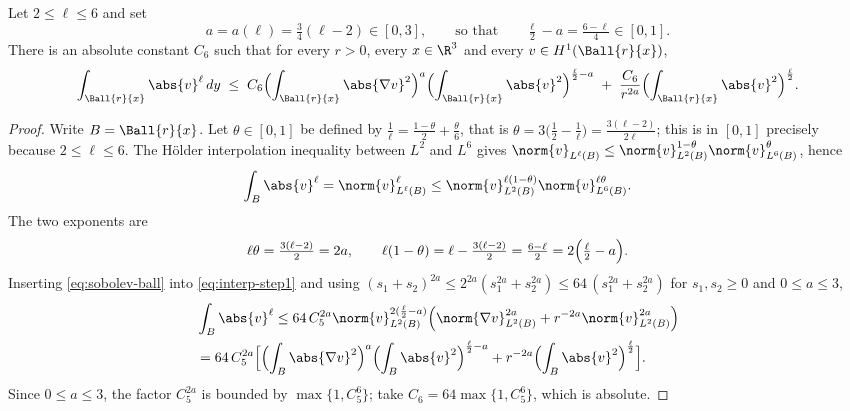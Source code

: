 \documentclass[11pt,reqno]{amsart}
\begin{document}
\begin{lemma}\label{lem:interpolation-ball}
Let $2\le \ell\le6$ and set
\begin{equation}\label{eq:a-exponent}
  a=a(\ell)=\tfrac34(\ell-2)\in[0,3],
  \qquad\text{so that}\qquad
  \tfrac \ell2-a=\tfrac{6-\ell}{4}\in[0,1].
\end{equation}
There is an absolute constant $C_{6}$ such that for every $r>0$, every
$x\in\R^{3}$ and every $v\in H^{1}(\Ball{r}{x})$,
\begin{equation}\label{eq:interpolation-ball}
  \int_{\Ball{r}{x}}\abs{v}^{\ell}\,dy
  \;\le\;C_{6}\Bigl(\int_{\Ball{r}{x}}\abs{\nabla v}^{2}\Bigr)^{a}
      \Bigl(\int_{\Ball{r}{x}}\abs{v}^{2}\Bigr)^{\frac \ell2-a}
     \;+\;\frac{C_{6}}{r^{2a}}\Bigl(\int_{\Ball{r}{x}}\abs{v}^{2}\Bigr)^{\frac \ell2}.
\end{equation}
\end{lemma}

\begin{proof}
Write $B=\Ball{r}{x}$. Let $\theta\in[0,1]$ be defined by
$\tfrac1\ell=\tfrac{1-\theta}{2}+\tfrac{\theta}{6}$, that is
$\theta=3\bigl(\tfrac12-\tfrac1\ell\bigr)=\tfrac{3(\ell-2)}{2\ell}$; this is in $[0,1]$
precisely because $2\le \ell\le6$. The H\"older interpolation inequality between
$L^{2}$ and $L^{6}$ gives
$\norm{v}_{L^{\ell}(B)}\le\norm{v}_{L^{2}(B)}^{1-\theta}\norm{v}_{L^{6}(B)}^{\theta}$,
hence
\begin{equation}\label{eq:interp-step1}
  \int_{B}\abs{v}^{\ell}
  =\norm{v}_{L^{\ell}(B)}^{\ell}
  \le\norm{v}_{L^{2}(B)}^{\ell(1-\theta)}\norm{v}_{L^{6}(B)}^{\ell\theta} .
\end{equation}
The two exponents are
\[
  \ell\theta=\tfrac{3(\ell-2)}{2}=2a,
  \qquad
  \ell(1-\theta)=\ell-\tfrac{3(\ell-2)}{2}=\tfrac{6-\ell}{2}=2\Bigl(\tfrac \ell2-a\Bigr).
\]
Inserting \eqref{eq:sobolev-ball} into \eqref{eq:interp-step1} and using
$(s_{1}+s_{2})^{2a}\le2^{2a}(s_{1}^{2a}+s_{2}^{2a})\le 64\,(s_{1}^{2a}+s_{2}^{2a})$
for $s_{1},s_{2}\ge0$ and $0\le a\le3$,
\[\begin{aligned}
  &\int_{B}\abs{v}^{\ell}
  \le 64\,C_{5}^{2a}\norm{v}_{L^{2}(B)}^{2(\frac \ell2-a)}
     \Bigl(\norm{\nabla v}_{L^{2}(B)}^{2a}+r^{-2a}\norm{v}_{L^{2}(B)}^{2a}\Bigr)
  \\ &=64\,C_{5}^{2a}\Bigl[
     \Bigl(\int_{B}\abs{\nabla v}^{2}\Bigr)^{a}\Bigl(\int_{B}\abs{v}^{2}\Bigr)^{\frac \ell2-a}
     +r^{-2a}\Bigl(\int_{B}\abs{v}^{2}\Bigr)^{\frac \ell2}\Bigr].
\end{aligned}\]
Since $0\le a\le3$, the factor $C_{5}^{2a}$ is bounded by $\max\{1,C_{5}^{6}\}$;
take $C_{6}=64\max\{1,C_{5}^{6}\}$, which is absolute.
\end{proof}
\end{document}
